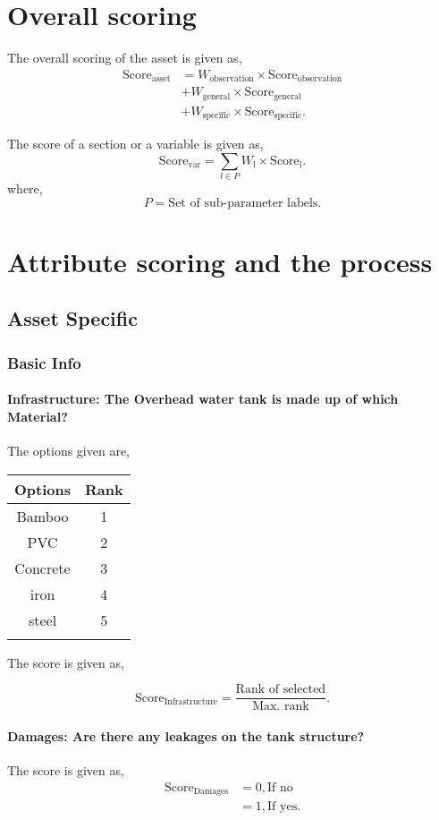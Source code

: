 \documentclass[oneside,twocolumn]{article}
\newcommand{\tsub}[2]{\text{#1}_{\text{#2}}}
\newcommand{\tsubb}[2]{#1_{\text{#2}}}
\newcommand{\dsub}[2]{\dfrac{\text{#1}}{\text{#2}}}
\newcommand{\singsel}[1]
{
	\[
		\tsub{Score}{#1} = \dsub{Rank of selected}{Max. rank}.
	\]
}
\newenvironment{ttable}
{
\begin{center}
\begin{tabular}{c|c}
\hline
}
{
\\ \hline
\end{tabular}
\end{center}
}
\begin{document}
\section{Overall scoring}
The overall scoring of the asset is given as,
\begin{align*}
	\tsub{Score}{asset} &= \tsubb{W}{observation} \times \tsub{Score}{observation} \\
	&+ \tsubb{W}{general} \times \tsub{Score}{general} \\
	&+ \tsubb{W}{specific} \times \tsub{Score}{specific}.
\end{align*}

The score of a section or a variable is given as,
\[
	\tsub{Score}{var} = \sum_{l \in P} \tsubb{W}{l} \times \tsub{Score}{l}.
\]
where,
\[
	P = \text{Set of sub-parameter labels.}
\]
\section{Attribute scoring and the
process}
\subsection{Asset Specific}
\subsubsection{Basic Info}

\paragraph{Infrastructure: 
The Overhead water tank is made up of which Material? 
}

The options given are,
\begin{ttable}
Options & Rank \\ \hline
Bamboo & 1 \\
PVC & 2 \\
Concrete & 3 \\
iron & 4 \\
steel & 5 \\
\hline
\end{ttable}
The score is given as,
\singsel{Infrastructure}
\paragraph{Damages: 
Are there any leakages on the tank structure? 
}

The score is given as,
\begin{align*}
\tsub{Score}{Damages} &= 0, \text{If no} \\
        &= 1, \text{If yes}.
\end{align*}
\end{document}
